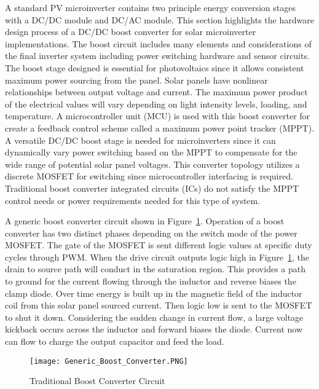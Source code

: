 A standard PV microinverter contains two principle energy conversion stages with a DC/DC module and DC/AC module. This section highlights the hardware design process of a DC/DC boost converter for solar microinverter implementations. The boost circuit includes many elements and considerations of the final inverter system including power switching hardware and sensor circuits. The boost stage designed is essential for photovoltaics since it allows consistent maximum power sourcing from the panel. Solar panels have nonlinear relationships between output voltage and current. The maximum power product of the electrical values will vary depending on light intensity levels, loading, and temperature. A microcontroller unit (MCU) is used with this boost converter for create a feedback control scheme called a maximum power point tracker (MPPT). A versatile DC/DC boost stage is needed for microinverters since it can dynamically vary power switching based on the MPPT to compensate for the wide range of potential solar panel voltages. This converter topology utilizes a discrete MOSFET for switching since microcontroller interfacing is required. Traditional boost converter integrated circuits (ICs) do not satisfy the MPPT control needs or power requirements needed for this type of system.  

A generic boost converter circuit shown in Figure~\ref{genericBoost}. Operation of a boost converter has two distinct phases depending on the switch mode of the power MOSFET. The gate of the MOSFET is sent different logic values at specific duty cycles through PWM. When the drive circuit outputs logic high in Figure~\ref{genericBoost}, the drain to source path will conduct in the saturation region. This provides a path to ground for the current flowing through the inductor and reverse biases the clamp diode. Over time energy is built up in the magnetic field of the inductor coil from this solar panel sourced current. Then logic low is sent to the MOSFET to shut it down. Considering the sudden change in current flow, a large voltage kickback occurs across the inductor and forward biases the diode. Current now can flow to charge the output capacitor and feed the load.

\begin{figure}
\centering
\texttt{[image: Generic\_Boost\_Converter.PNG]}
\caption{Traditional Boost Converter Circuit}
\label{genericBoost}
\end{figure}

